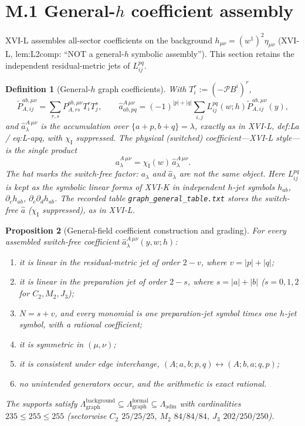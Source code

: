 \documentclass{article}
\newtheorem{proposition}{Proposition}
\newtheorem{definition}[proposition]{Definition}
\theoremstyle{remark}
\newcommand{\Pc}{\mathcal P}
\newcommand{\chiI}{\chi_{\mathrm I}}
\begin{document}
\section{M.1 General-$h$ coefficient assembly}
\label{sec:m1}

XVI-L assembles all-sector coefficients on the background $h_{\mu\nu}=(w^1)^2\eta_{\mu\nu}$ (XVI-L, lem:L2comp: ``NOT a general-$h$ symbolic assembly'').
This section retains the independent residual-metric jets of $L^{pq}_{ij}$.

\begin{definition}[General-$h$ graph coefficients]
\label{def:aGeneral}
With $T_i^r:=(-\Pc B^i)^r$,
\[
\widetilde P_{A,ij}^{ab,\mu\nu}=\sum_{r,s}P_{A,rs}^{ab,\mu\nu}T_i^rT_j^s,\qquad
\hat a^{A\,\mu\nu}_{ab,pq}=(-1)^{|p|+|q|}\sum_{i,j}L^{pq}_{ij}(w;h)\widetilde P_{A,ij}^{ab,\mu\nu}(y),
\]
and $\hat a^{A\,\mu\nu}_\lambda$ is the accumulation over $\{a+p,b+q\}=\lambda$, exactly as in XVI-L, def:La / eq:L-apq, \emph{with $\chiI$ suppressed}.
The physical (switched) coefficient---XVI-L style---is the single product
\[
a^{A\,\mu\nu}_\lambda=\chiI(w)\,\hat a^{A\,\mu\nu}_\lambda.
\]
The hat marks the switch-free factor: $a_\lambda$ and $\hat a_\lambda$ are not the same object.
Here $L^{pq}_{ij}$ is kept as the symbolic linear forms of XVI-K in independent $h$-jet symbols $h_{ab}$, $\partial_ch_{ab}$, $\partial_c\partial_dh_{ab}$.
The recorded table \texttt{graph\_general\_table.txt} stores the switch-free $\hat a$ ($\chiI$ suppressed), as in XVI-L.
\end{definition}

\begin{proposition}[General-field coefficient construction and grading]
\label{prop:M1}
For every assembled switch-free coefficient $\hat a^{A\,\mu\nu}_\lambda(y,w;h)$:
\begin{enumerate}
\item it is linear in the residual-metric jet of order $2-v$, where $v=|p|+|q|$;
\item it is linear in the preparation jet of order $2-s$, where $s=|a|+|b|$ ($s=0,1,2$ for $C_2,M_2,J_3$);
\item $N=s+v$, and every monomial is one preparation-jet symbol times one $h$-jet symbol, with a rational coefficient;
\item it is symmetric in $(\mu,\nu)$;
\item it is consistent under edge interchange, $(A;a,b;p,q)\leftrightarrow(A;b,a;q,p)$;
\item no unintended generators occur, and the arithmetic is exact rational.
\end{enumerate}
The supports satisfy $\Lambda_{\mathrm{graph}}^{\mathrm{background}}\subseteq\Lambda_{\mathrm{graph}}^{\mathrm{formal}}\subseteq\Lambda_{\mathrm{adm}}$ with cardinalities $235\le255\le255$ (sectorwise $C_2$ $25/25/25$, $M_2$ $84/84/84$, $J_3$ $202/250/250$).
\end{proposition}
\end{document}
